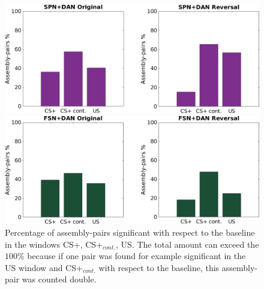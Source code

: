  \begin{figure}
    \centering
    \includegraphics[scale=0.34]{figures/SPN_DANHisto.pdf}
    
    \vspace{1cm}
    
    \includegraphics[scale=0.34]{figures/FSN_DANHisto.pdf}
\caption{Percentage of assembly-pairs significant with respect to the baseline in the windows CS+, CS+$_{cont.}$, US. The total amount can exceed the $100\%$ because if one pair was found for example significant in the US window and CS+$_{cont.}$ with respect to the baseline, this assembly-pair was counted double.}
    \label{fig:FriedHistoDAN}
\end{figure}
